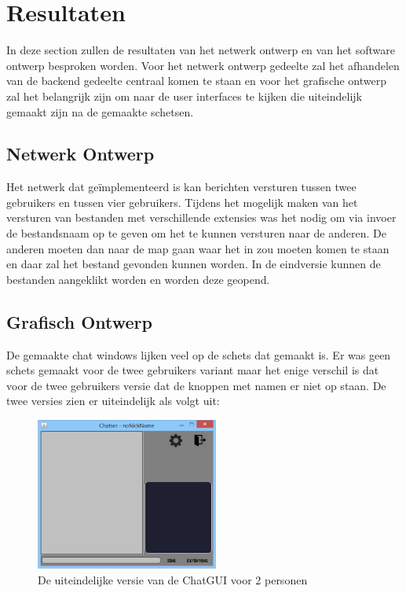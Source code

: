 \documentclass[12pt]{article}
\begin{document}
\section{Resultaten}
In deze section zullen de resultaten van het netwerk ontwerp en van het software ontwerp besproken worden. Voor het netwerk ontwerp gedeelte zal het afhandelen van de backend gedeelte centraal komen te staan en voor het grafische ontwerp zal het belangrijk zijn om naar de user interfaces te kijken die uiteindelijk gemaakt zijn na de gemaakte schetsen. 

\subsection{Netwerk Ontwerp}
Het netwerk dat ge\"implementeerd is kan berichten versturen tussen twee gebruikers en tussen vier gebruikers. Tijdens het mogelijk maken van het versturen van bestanden met verschillende extensies was het nodig om via invoer de bestandsnaam op te geven om het te kunnen versturen naar de anderen. De anderen moeten dan naar de map gaan waar het in zou moeten komen te staan en daar zal het bestand gevonden kunnen worden. In de eindversie kunnen de bestanden aangeklikt worden en worden deze geopend.

\subsection{Grafisch Ontwerp}
De gemaakte chat windows lijken veel op de schets dat gemaakt is. Er was geen schets gemaakt voor de twee gebruikers variant maar het enige verschil is dat voor de twee gebruikers versie dat de knoppen met namen er niet op staan. De twee versies zien er uiteindelijk als volgt uit:
\begin{figure}[ht]
\begin{center}
\includegraphics[width = 60mm]{chatser2}
\caption{De uiteindelijke versie van de ChatGUI voor 2 personen}
\label{figure007}
\end{center}
\end{figure}
\end{document}
